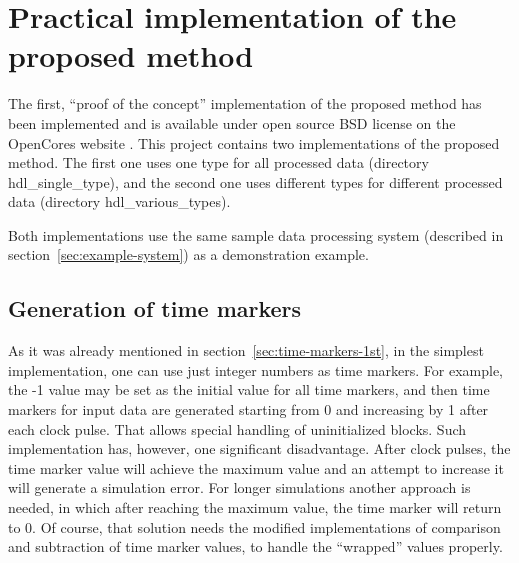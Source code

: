 \documentclass[preprint,11pt]{elsarticle}
\newcommand{\wzcite}[1]{ \cite{#1}}
\begin{document}
\section{Practical implementation of the proposed method}
\label{sec:practical-implementation}
The first, ``proof of the concept'' implementation of the proposed method has been implemented and is available under open source BSD license on the OpenCores
website\wzcite{url-opencores-lateq}.
This project contains two implementations of the proposed method.
The first one uses one type for all processed data (directory hdl\_single\_type), and the 
second one uses different types for different processed data (directory 
hdl\_various\_types).

Both implementations use the same sample data processing system (described in section~\ref{sec:example-system}) as a demonstration
example.
\subsection{Generation of time markers}
\label{sec:time-markers-2nd}
As it was already mentioned in section~\ref{sec:time-markers-1st}, in the simplest implementation, 
one can use just integer numbers as time markers.
For example, the -1 value may be set as the initial value for all time markers, and
then time markers for input data are generated starting from 0 and increasing by 1 after each clock pulse.
That allows special handling of uninitialized blocks.
Such implementation has, however, one significant disadvantage. After  clock pulses,
the time marker value will achieve the maximum value and an attempt to increase it will generate a simulation error.
For longer simulations another approach is needed, in which after reaching the maximum value, the time marker will return to 0. Of course, that solution needs the modified
implementations of comparison and subtraction of time marker values, to handle the ``wrapped'' values properly.
\end{document}

